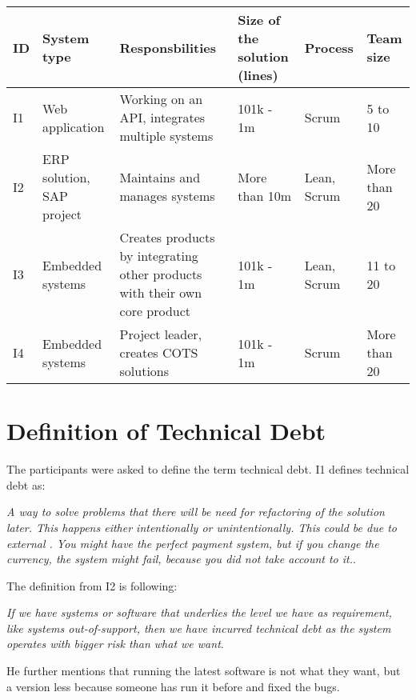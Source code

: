 \begin{table}[ht!]
	\centering
    \begin{tabular}{|p{0.5cm}|p{2.5cm}|p{3.5cm}|p{2cm}|p{2cm}|p{2cm}|}
    \hline
    \textbf{ID} & \textbf{System type} & \textbf{Responsbilities} & \textbf{Size of the solution (lines)} & \textbf{Process} & \textbf{Team size}\\ \hline
    I1 & Web application & Working on an API, integrates multiple systems & 101k - 1m & Scrum & 5 to 10 \\ \hline
    I2 & ERP solution, SAP project & Maintains and manages systems & More than 10m & Lean, Scrum & More than 20 \\ \hline
    I3 & Embedded systems & Creates products by integrating other products with their own core product & 101k - 1m & Lean, Scrum & 11 to 20\\ \hline
    I4 & Embedded systems & Project leader, creates COTS solutions & 101k - 1m & Scrum & More than 20 \\ \hline
    \end{tabular}
\end{table}


\section{Definition of Technical Debt}
\label{sec:techDebt}
The participants were asked to define the term technical debt. I1 defines technical debt as:
\begin{displayquote}
\textit{A way to solve problems that there will be need for refactoring of the solution later. This happens either intentionally or unintentionally. This could be due to external . You might have the perfect payment system, but if you change the currency, the system might fail, because you did not take account to it.}.  
\end{displayquote}

The definition from I2 is following:
\begin{displayquote}
\textit{If we have systems or software that underlies the level we have as requirement, like systems out-of-support, then we have incurred technical debt as the system operates with bigger risk than what we want}.
\end{displayquote}
He further mentions that running the latest software is not what they want, but a version less because someone has run it before and fixed the bugs.

